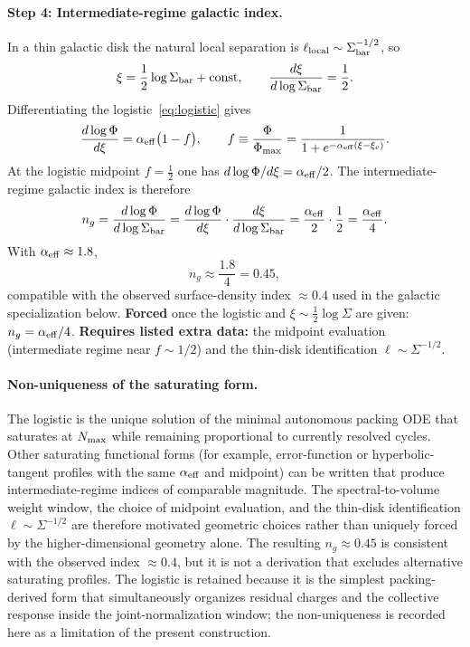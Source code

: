 \documentclass[11pt,a4paper]{article}
\begin{document}
\paragraph{Step 4: Intermediate-regime galactic index.}
In a thin galactic disk the natural local separation is \(\ell_{\rm local}\sim\Sigma_{\rm bar}^{-1/2}\), so
\begin{equation}
\xi=\frac12\log\Sigma_{\rm bar}+\text{const},
\qquad
\frac{d\xi}{d\log\Sigma_{\rm bar}}=\frac12.
\label{eq:xi-Sigma}
\end{equation}
Differentiating the logistic~\eqref{eq:logistic} gives
\begin{equation}
\frac{d\log\Phi}{d\xi}=\alpha_{\rm eff}\bigl(1-f\bigr),\qquad
f\equiv\frac{\Phi}{\Phi_{\rm max}}=\frac{1}{1+e^{-\alpha_{\rm eff}(\xi-\xi_c)}}.
\label{eq:dlogPhi}
\end{equation}
At the logistic midpoint \(f=\tfrac12\) one has \(d\log\Phi/d\xi=\alpha_{\rm eff}/2\). The intermediate-regime galactic index is therefore
\begin{equation}
n_g
=\frac{d\log\Phi}{d\log\Sigma_{\rm bar}}
=\frac{d\log\Phi}{d\xi}\cdot\frac{d\xi}{d\log\Sigma_{\rm bar}}
=\frac{\alpha_{\rm eff}}{2}\cdot\frac12
=\frac{\alpha_{\rm eff}}{4}.
\label{eq:galactic-index}
\end{equation}
With \(\alpha_{\rm eff}\approx 1.8\),
\begin{equation}
n_g\approx\frac{1.8}{4}=0.45,
\label{eq:ng-045}
\end{equation}
compatible with the observed surface-density index \(\approx 0.4\) used in the galactic specialization below. \textbf{Forced} once the logistic and \(\xi\sim\tfrac12\log\Sigma\) are given: \(n_g=\alpha_{\rm eff}/4\). \textbf{Requires listed extra data:} the midpoint evaluation (intermediate regime near \(f\sim 1/2\)) and the thin-disk identification \(\ell\sim\Sigma^{-1/2}\).

\paragraph{Non-uniqueness of the saturating form.}
The logistic is the unique solution of the minimal autonomous packing ODE that saturates at \(N_{\rm max}\) while remaining proportional to currently resolved cycles. Other saturating functional forms (for example, error-function or hyperbolic-tangent profiles with the same \(\alpha_{\rm eff}\) and midpoint) can be written that produce intermediate-regime indices of comparable magnitude. The spectral-to-volume weight window, the choice of midpoint evaluation, and the thin-disk identification \(\ell\sim\Sigma^{-1/2}\) are therefore motivated geometric choices rather than uniquely forced by the higher-dimensional geometry alone. The resulting \(n_g\approx 0.45\) is consistent with the observed index \(\approx 0.4\), but it is not a derivation that excludes alternative saturating profiles. The logistic is retained because it is the simplest packing-derived form that simultaneously organizes residual charges and the collective response inside the joint-normalization window; the non-uniqueness is recorded here as a limitation of the present construction.
\end{document}
